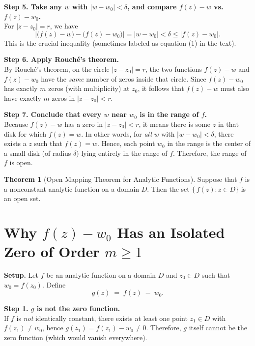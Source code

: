 \documentclass[12pt]{article}
\theoremstyle{definition} %
\newtheorem{theorem}{Theorem}
\theoremstyle{plain} %
\begin{document}
\noindent
\textbf{Step 5. Take any $w$ with $|w - w_0| < \delta$, and compare $f(z) - w$ vs.\ $f(z) - w_0$.}\\
For $|z - z_0| = r$, we have
\[
  \bigl|\bigl(f(z) - w\bigr) - \bigl(f(z) - w_0\bigr)\bigr|
  = |w - w_0| < \delta \le |f(z) - w_0|.
\]
This is the crucial inequality (sometimes labeled as equation (1) in the text).

\medskip

\noindent
\textbf{Step 6. Apply Rouch\'e's theorem.}\\
By Rouch\'e's theorem, on the circle $|z - z_0| = r$, the two functions $f(z) - w$ and $f(z) - w_0$
have the \emph{same} number of zeros inside that circle.  Since $f(z) - w_0$ has exactly $m$ zeros
(with multiplicity) at $z_0$, it follows that $f(z) - w$ must also have exactly $m$ zeros in
$|z - z_0| < r$.

\medskip

\noindent
\textbf{Step 7. Conclude that every $w$ near $w_0$ is in the range of $f$.}\\
Because $f(z) - w$ has a zero in $|z - z_0| < r$, it means there is some $z$ in that disk for which
$f(z) = w$.  In other words, for \emph{all} $w$ with $|w - w_0| < \delta$, there exists a $z$ such that
$f(z) = w$.  Hence, each point $w_0$ in the range is the center of a small disk (of radius $\delta$)
lying entirely in the range of $f$.  Therefore, the range of $f$ is open.

\begin{theorem}[Open Mapping Theorem for Analytic Functions]
Suppose that $f$ is a nonconstant analytic function on a domain $D$. Then the set 
$\{\,f(z) : z \in D\}$ is an open set.
\end{theorem}
\section*{Why $f(z) - w_0$ Has an Isolated Zero of Order $m \ge 1$}

\noindent
\textbf{Setup.} Let $f$ be an analytic function on a domain $D$ and $z_0 \in D$ such that
$w_0 = f(z_0)$.  Define 
\[
  g(z) \;=\; f(z) \;-\; w_0.
\]

\medskip

\noindent
\textbf{Step 1. $g$ is not the zero function.}\\
If $f$ is \emph{not} identically constant, there exists at least one point $z_1 \in D$ with
$f(z_1) \neq w_0$, hence $g(z_1) = f(z_1) - w_0 \neq 0$.  Therefore, $g$ itself cannot be the zero
function (which would vanish everywhere).
\end{document}
